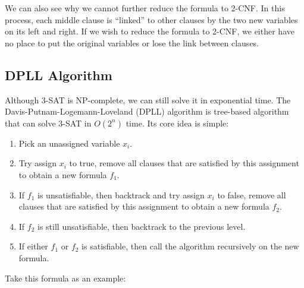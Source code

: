 \documentclass[a4paper,12pt]{article}
\begin{document}
We can also see why we cannot further reduce the formula to 2-CNF.
In this process, each middle clause is ``linked'' to other clauses by the two new variables on its left and right.
If we wish to reduce the formula to 2-CNF, we either have no place to put the original variables or lose the link between clauses.

\subsection{DPLL Algorithm}

Although 3-SAT is NP-complete, we can still solve it in exponential time.
The Davis-Putnam-Logemann-Loveland (DPLL) algorithm is tree-based algorithm that can solve 3-SAT in $O(2^n)$ time.
Its core idea is simple:
\begin{enumerate}
	\item Pick an unassigned variable $x_i$.
	\item Try assign $x_i$ to true, remove all clauses that are satisfied by this assignment to obtain a new formula $f_1$.
	\item If $f_1$ is unsatisfiable, then backtrack and try assign $x_i$ to false, remove all clauses that are satisfied by this assignment to obtain a new formula $f_2$.
	\item If $f_2$ is still unsatisfiable, then backtrack to the previous level.
	\item If either $f_1$ or $f_2$ is satisfiable, then call the algorithm recursively on the new formula.
\end{enumerate}

\vspace{0.5cm}

Take this formula as an example: 
\end{document}
